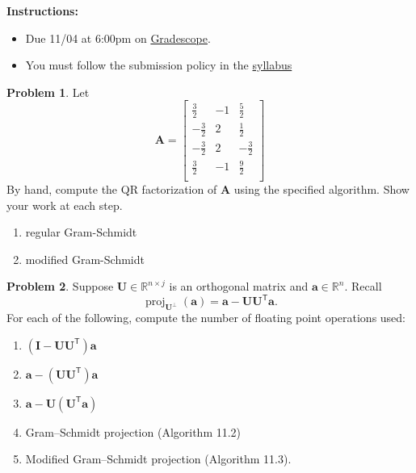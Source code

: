 \documentclass[12pt]{article}
\theoremstyle{definition}
\newtheorem{problem}{Problem}
\renewcommand{\vec}{\mathbf}
\newcommand{\T}{\mathsf{T}}
\begin{document}
\textbf{\Large{}}
    
    \vspace{-1.8em}
    \hrulefill

    \textbf{Instructions:}
    \begin{itemize}
        \item Due 11/04 at 6:00pm on \href{https://www.gradescope.com/courses/818054}{Gradescope}.
        \item You must follow the submission policy in the \href{https://courses.chen.pw/na_f2024/syllabus.html}{syllabus} 
\end{itemize}
   
\vspace{.5em}

\begin{problem}
    Let \[
        \vec{A} = 
        \begin{bmatrix}
 \frac{3}{2} & -1 & \frac{5}{2} \\
 -\frac{3}{2} & 2 & \frac{1}{2} \\
 -\frac{3}{2} & 2 & -\frac{3}{2} \\
 \frac{3}{2} & -1 & \frac{9}{2} \\
        \end{bmatrix}
    \]
    By hand, compute the QR factorization of $\vec{A}$ using the specified algorithm. Show your work at each step.
    \begin{enumerate}
        \item regular Gram-Schmidt 
        \item modified Gram-Schmidt 
    \end{enumerate}
\end{problem}


\begin{problem}
    Suppose $\vec{U}\in\mathbb{R}^{n\times j}$ is an orthogonal matrix and $\vec{a}\in\mathbb{R}^n$.
    Recall
    \[
        \operatorname{proj}_{\vec{U}^\perp}(\vec{a}) = \vec{a} - \vec{U}\vec{U}^\T \vec{a}.
    \]
    For each of the following, compute the number of floating point operations used:
    \begin{enumerate}
        \item $(\vec{I} - \vec{U}\vec{U}^\T) \vec{a}$
        \item $\vec{a} - (\vec{U}\vec{U}^\T)\vec{a}$ 
        \item $\vec{a} - \vec{U}(\vec{U}^\T\vec{a})$ 
        \item Gram--Schmidt projection (Algorithm 11.2) 
        \item Modified Gram--Schmidt projection (Algorithm 11.3).
    \end{enumerate}
\end{problem}
\end{document}
